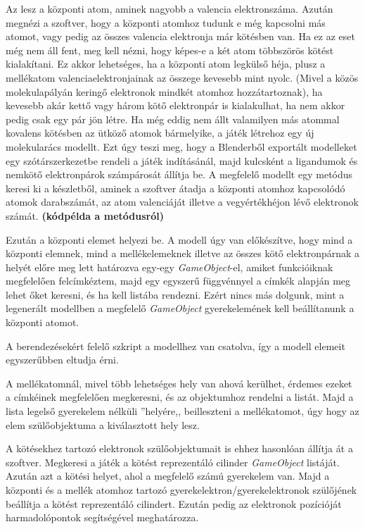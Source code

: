 \documentclass[colorlinks]{thesis-ekf}
\theoremstyle{definition}
\theoremstyle{remark}
\begin{document}
Az lesz a központi atom, aminek nagyobb a valencia elektronszáma. Azután megnézi a szoftver, hogy a központi atomhoz tudunk e még kapcsolni más atomot, vagy pedig az összes valencia elektronja már kötésben van. Ha ez az eset még nem áll fent, meg kell nézni, hogy képes-e a két atom többszörös kötést kialakítani. Ez akkor lehetséges, ha a központi atom legkülső héja, plusz a mellékatom valenciaelektronjainak az összege kevesebb mint nyolc. (Mivel a közös molekulapályán keringő elektronok mindkét atomhoz hozzátartoznak), ha kevesebb akár kettő vagy három kötő elektronpár is kialakulhat, ha nem akkor pedig csak egy pár jön létre.
Ha még eddig nem állt valamilyen más atommal kovalens kötésben az ütköző atomok bármelyike, a játék létrehoz egy új molekularács modellt. Ezt úgy teszi meg, hogy a Blenderből exportált modelleket egy szótárszerkezetbe rendeli a játék indításánál, majd kulcsként a ligandumok és nemkötő elektronpárok számpárosát állítja be. A megfelelő modellt egy metódus keresi ki a készletből, aminek a szoftver átadja a központi atomhoz kapcsolódó atomok darabszámát, az atom valenciáját illetve a vegyértékhéjon lévő elektronok számát.\textbf{ (kódpélda a metódusról)}

Ezután a központi elemet helyezi be. A modell úgy van előkészítve, hogy mind a központi elemnek, mind a mellékelemeknek illetve az összes kötő elektronpárnak a helyét előre meg lett határozva egy-egy \textit{GameObject}-el, amiket funkcióiknak megfelelően felcímkéztem, majd egy egyszerű függvénnyel a címkék alapján meg lehet őket keresni, és ha kell listába rendezni. Ezért nincs más dolgunk, mint a legenerált modellben a megfelelő \textit{GameObject} gyerekelemének kell beállítanunk a központi atomot.

A berendezésekért felelő szkript a modellhez van csatolva, így a modell elemeit egyszerűbben eltudja érni. 

A mellékatomnál, mivel több lehetséges hely van ahová kerülhet, érdemes ezeket a címkéinek megfelelően megkeresni, és az objektumhoz rendelni a listát. Majd a lista legelső gyerekelem nélküli ''helyére,, beilleszteni a mellékatomot, úgy hogy az elem szülőobjektuma a kiválasztott hely lesz.

A kötésekhez tartozó elektronok szülőobjektumait is ehhez hasonlóan állítja át a szoftver. Megkeresi a játék a kötést reprezentáló cilinder \textit{GameObject} listáját. Azután azt a kötési helyet, ahol a megfelelő számú gyerekelem van. Majd a központi és a mellék atomhoz tartozó gyerekelektron/gyerekelektronok szülőjének beállítja a kötést reprezentáló cilindert. Ezután pedig az elektronok pozícióját harmadolópontok segítségével meghatározza.
\end{document}
